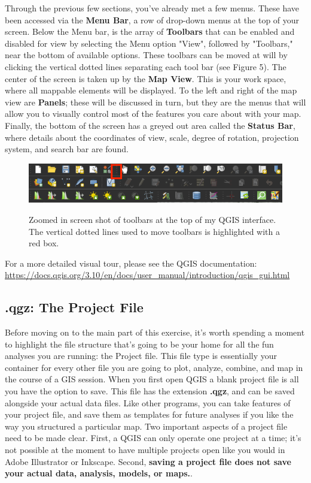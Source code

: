 \documentclass{article}
\begin{document}
Through the previous few sections, you've already met a few menus. These have been accessed via the \textbf{Menu Bar}, a row of drop-down menus at the top of your screen. Below the Menu bar, is the array of \textbf{Toolbars} that can be enabled and disabled for view by selecting the Menu option "View", followed by "Toolbars," near the bottom of available options. These toolbars can be moved at will by clicking the vertical dotted lines separating each tool bar (see Figure 5). The center of the screen is taken up by the \textbf{Map View}. This is your work space, where all mappable elements will be displayed. To the left and right of the map view are \textbf{Panels}; these will be discussed in turn, but they are the menus that will allow you to visually control most of the features you care about with your map. Finally, the bottom of the screen has a greyed out area called the \textbf{Status Bar}, where details about the coordinates of view, scale, degree of rotation, projection system, and search bar are found. 

\begin{figure}[htbp]
    \centering
    \includegraphics[width=\textwidth]{Fig_6_Toolbars.png}
    \label{fig6}
    \caption{Zoomed in screen shot of toolbars at the top of my QGIS interface. The vertical dotted lines used to move toolbars is highlighted with a red box.}
\end{figure}

For a more detailed visual tour, please see the QGIS documentation: \url{https://docs.qgis.org/3.10/en/docs/user_manual/introduction/qgis_gui.html}

\subsection{.qgz: The Project File}

Before moving on to the main part of this exercise, it's worth spending a moment to highlight the file structure that's going to be your home for all the fun analyses you are running: the Project file. This file type is essentially your container for every other file you are going to plot, analyze, combine, and map in the course of a GIS session. When you first open QGIS a blank project file is all you have the option to save. This file has the extension \textbf{.qgz}, and can be saved alongside your actual data files. Like other programs, you can take features of your project file, and save them as templates for future analyses if you like the way you structured a particular map. Two important aspects of a project file need to be made clear. First, a QGIS can only operate one project at a time; it's not possible at the moment to have multiple projects open like you would in Adobe Illustrator or Inkscape. Second, \textbf{saving a project file does not save your actual data, analysis, models, or maps.}. 
\end{document}
